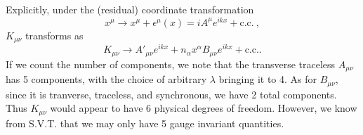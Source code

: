 \documentclass[10pt,letterpaper]{article}
\numberwithin{equation}{subsection}
\begin{document}
Explicitly, under the (residual) coordinate transformation 
\begin{equation}
x^\mu \to x^\mu + \epsilon^\mu(x) = iA^\mu e^{ikx} + \text{c.c.}\ ,
\end{equation}
$K_{\mu\nu}$ transforms as
\begin{equation}
K_{\mu\nu} \to A'_{\mu\nu}e^{ikx} + n_\alpha x^\alpha B_{\mu\nu} e^{ikx}  + \text{c.c.}.
\end{equation}
If we count the number of components, we note that the transverse traceless $A_{\mu\nu}$ has 5 components, with the choice of arbitrary $\lambda$ bringing it to 4. As for $B_{\mu\nu}$, since it is tranverse, traceless, and synchronous, we have 2 total components. Thus $K_{\mu\nu}$ would appear to have 6 physical degrees of freedom. However, we know from S.V.T. that we may only have 5 gauge invariant quantities.
\\ \\
\end{document}

